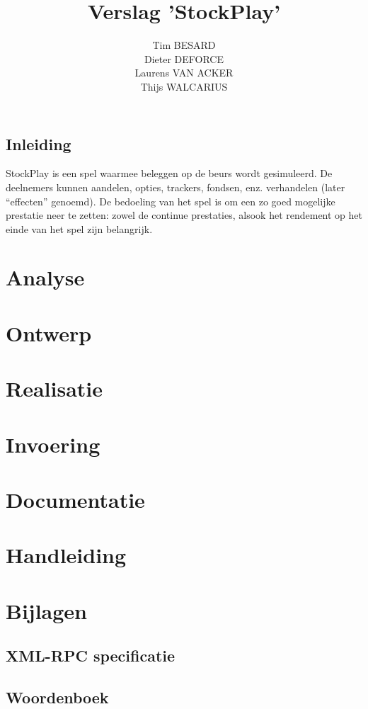 \documentclass[a4paper,oneside,final]{memoir}
\title{Verslag 'StockPlay'}
\author{
Tim BESARD\\
Dieter DEFORCE\\
Laurens VAN ACKER\\
Thijs WALCARIUS
}
\begin{document}
\maketitle
{}
\tableofcontents
{}


%
%

\chapter*{Inleiding}
StockPlay is een spel waarmee beleggen op de beurs wordt gesimuleerd. De deelnemers kunnen aandelen, opties, trackers, fondsen, enz. verhandelen (later ``effecten'' genoemd). De bedoeling van het spel is om een zo goed mogelijke prestatie neer te zetten: zowel de continue prestaties, alsook het rendement op het einde van het spel zijn belangrijk.

\part{Analyse}


\part{Ontwerp}


\part{Realisatie}


\part{Invoering}


\part{Documentatie}


\part{Handleiding}


%
%

\part{Bijlagen}
\appendix

\chapter{XML-RPC specificatie}


\chapter{Woordenboek}

\end{document}
